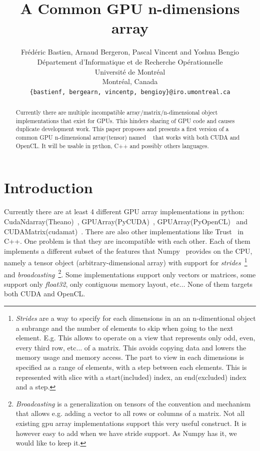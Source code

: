 \documentclass{article} %
\title{A Common GPU n-dimensions array}
\author{
Frédéric Bastien, Arnaud Bergeron, Pascal Vincent and Yoshua Bengio \\
D\'epartement d'Informatique et de Recherche Op\'erationnelle\\
Universit\'e de Montr\'eal\\
Montr\'eal, Canada \\
\texttt{\{bastienf, bergearn, vincentp, bengioy\}@iro.umontreal.ca} \\
}
\begin{document}
\maketitle

\begin{abstract}
Currently there are multiple incompatible array/matrix/n-dimensional object implementations
that exist for GPUs. This hinders sharing of GPU code and causes
duplicate development work. This paper proposes and presents a
first version of a common GPU n-dimensional
array(tensor) named ~\citep{GpuNdArray} that works with both CUDA and OpenCL. 
It will be usable in python, C++ and possibly others languages.
\end{abstract}

\section{Introduction}
Currently there are at least 4 different GPU array implementations in
python: CudaNdarray(Theano)~\citep{bergstra+al:2010-scipy},
GPUArray(PyCUDA)~\citep{kloeckner_pycuda_2009},
GPUArray(PyOpenCL)~\citep{kloeckner_pycuda_2009} and
CUDAMatrix(cudamat)~\citep{cudamat-TR2009}. There are also other
implementations like Trust~\citep{Thrust} in C++. One problem is that they are
incompatible with each other. Each of them implements a different
subset of the features that Numpy~\citep{numpy-2007} provides on the
CPU, namely a tensor object (arbitrary-dimensional array) with support
for \emph{strides}~\footnote{
\emph{Strides} are a way to specify for each dimensions in an an n-dimentional object a subrange and the number of elements to skip when going
to the next element. E.g. This allows
to operate on a view that represents only odd, even, every third row, etc$\ldots$ of
a matrix. This avoids copying data and lowers the memory usage and memory
access. The part to view in each dimensions is specified as a range of elements, with a
step between each elements. This is represented with slice with a start(included) index, an
end(excluded) index and a step.
}
 and \emph{broadcasting}~\footnote{
\emph{Broadcasting} is a generalization on tensors of the convention and mechanism that allows e.g. adding a
vector to all rows or columns of a matrix. Not all existing gpu array implementations
support this very useful construct. It is however easy to add when we have
stride support. As Numpy has it, we would like to keep it.}.  Some implementations
support only vectors or matrices, some support only \emph{float32},
only contiguous memory layout, etc$\ldots$ None of them targets both
CUDA and OpenCL.
\end{document}
